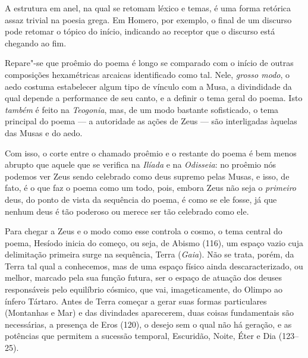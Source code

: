 A estrutura em anel, na qual se retomam léxico e temas, é uma forma
retórica assaz trivial na poesia grega. Em Homero, por exemplo, o final
de um discurso pode retomar o tópico do início, indicando ao receptor
que o discurso está chegando ao fim.

Repare"-se que proêmio do poema é longo se comparado com o início de
outras composições hexamétricas arcaicas identificado como tal. Nele,
\emph{grosso modo}, o aedo costuma estabelecer algum tipo de vínculo com
a Musa, a divindidade da qual depende a performance de seu canto, e a
definir o tema geral do poema. Isto \emph{também} é feito na
\emph{Teogonia}, mas, de um modo bastante sofisticado, o tema principal
do poema --- a autoridade as ações de Zeus --- são interligadas àquelas
das Musas e do aedo.

Com isso, o corte entre o chamado proêmio e o restante do poema é bem
menos abrupto que aquele que se verifica na \emph{Ilíada} e na
\emph{Odisseia}: no proêmio nós podemos ver Zeus sendo celebrado como
deus supremo pelas Musas, e isso, de fato, é o que faz o poema como um
todo, pois, embora Zeus não seja o \emph{primeiro} deus, do ponto de
vista da sequência do poema, é como se ele fosse, já que nenhum deus é
tão poderoso ou merece ser tão celebrado como ele.


Para chegar a Zeus e o modo como esse controla o cosmo, o tema central
do poema, Hesíodo inicia do começo, ou seja, de Abismo (116), um espaço
vazio cuja delimitação primeira surge na sequência, Terra (\emph{Gaia}).
Não se trata, porém, da Terra tal qual a conhecemos, mas de uma espaço
físico ainda descaracterizado, ou melhor, marcado pela sua função
futura, ser o espaço de atuação dos deuses responsáveis pelo equilíbrio
cósmico, que vai, imageticamente, do Olimpo ao ínfero Tártaro. Antes de
Terra começar a gerar suas formas particulares (Montanhas e Mar) e das
divindades aparecerem, duas coisas fundamentais são necessárias, a
presença de Eros (120), o desejo sem o qual não há geração, e as
potências que permitem a sucessão temporal, Escuridão, Noite, Éter e Dia
(123--25).

